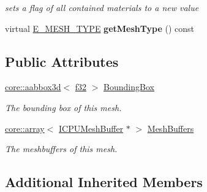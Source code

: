 \begin{DoxyCompactItemize}
\begin{DoxyCompactList}\small\item\em sets a flag of all contained materials to a new value \end{DoxyCompactList}\item 
virtual \hyperlink{namespaceirr_1_1scene_aef0400177e5941293dff6640e800d11b}{E\+\_\+\+M\+E\+S\+H\+\_\+\+T\+Y\+PE} {\bfseries get\+Mesh\+Type} () const \hypertarget{classirr_1_1scene_1_1SCPUMesh_a266ee0d216af20efe48bfc350092de3f}{}\label{classirr_1_1scene_1_1SCPUMesh_a266ee0d216af20efe48bfc350092de3f}

\end{DoxyCompactItemize}
\subsection*{Public Attributes}
\begin{DoxyCompactItemize}
\item 
\hyperlink{classirr_1_1core_1_1aabbox3d}{core\+::aabbox3d}$<$ \hyperlink{namespaceirr_a0277be98d67dc26ff93b1a6a1d086b07}{f32} $>$ \hyperlink{classirr_1_1scene_1_1SCPUMesh_ab47e4766cfa10e9caf1d737995af3e38}{Bounding\+Box}\hypertarget{classirr_1_1scene_1_1SCPUMesh_ab47e4766cfa10e9caf1d737995af3e38}{}\label{classirr_1_1scene_1_1SCPUMesh_ab47e4766cfa10e9caf1d737995af3e38}

\begin{DoxyCompactList}\small\item\em The bounding box of this mesh. \end{DoxyCompactList}\item 
\hyperlink{classirr_1_1core_1_1array}{core\+::array}$<$ \hyperlink{classirr_1_1scene_1_1ICPUMeshBuffer}{I\+C\+P\+U\+Mesh\+Buffer} $\ast$ $>$ \hyperlink{classirr_1_1scene_1_1SCPUMesh_ae9b5e64d0e12205febd5e99e85dc9636}{Mesh\+Buffers}\hypertarget{classirr_1_1scene_1_1SCPUMesh_ae9b5e64d0e12205febd5e99e85dc9636}{}\label{classirr_1_1scene_1_1SCPUMesh_ae9b5e64d0e12205febd5e99e85dc9636}

\begin{DoxyCompactList}\small\item\em The meshbuffers of this mesh. \end{DoxyCompactList}\end{DoxyCompactItemize}
\subsection*{Additional Inherited Members}


